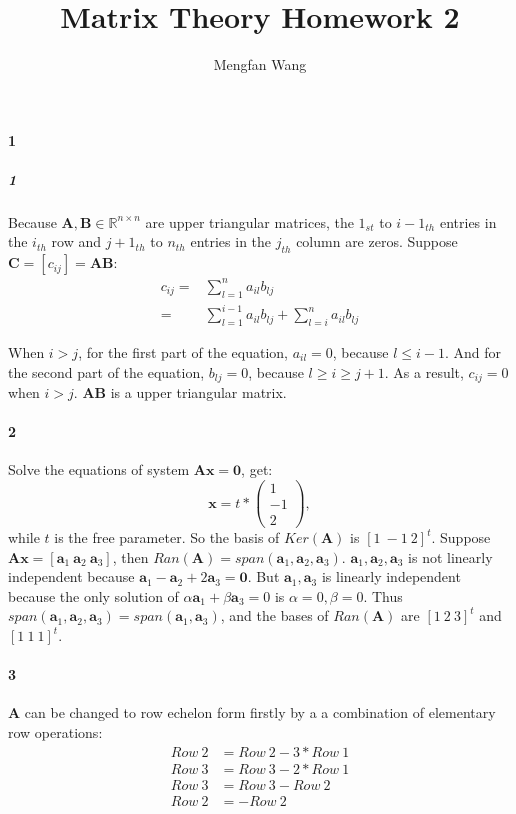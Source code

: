 \documentclass[22pt]{article}
\author{Mengfan Wang}
\title{Matrix Theory Homework 2}
\begin{document}
	\maketitle 
	\paragraph{1}
		\subparagraph{1} Because $\mathbf{A},\mathbf{B} \in \mathbb{R}^{n\times n}$ are upper triangular matrices, the $1_{st}$ to $i-1_{th}$ entries in the $i_{th}$ row and $j+1_{th}$ to $n_{th}$ entries in the $j_{th}$ column are zeros. Suppose $\mathbf{C} =[c_{ij}]= \mathbf{AB}$:
		\begin{align}
			c_{ij} =& \sum\limits_{l=1}^{n}a_{il}b_{lj}\\ =& \sum\limits_{l=1}^{i-1}a_{il}b_{lj} + \sum\limits_{l=i}^{n}a_{il}b_{lj}
		\end{align}

		When $i>j$, for the first part of the equation, $a_{il} = 0$, because $l \leq i-1$. And for the second part of the equation, $b_{lj}=0$, because $l \geq i \geq j+1$. As a result, $c_{ij} =0$ when $i>j$. $\mathbf{AB}$ is a upper triangular matrix.

	\paragraph{2} Solve the equations of system $\mathbf{Ax} = \mathbf{0}$, get:
	\begin{equation}
		\mathbf{x} = t*\left( \begin{array}{c} 1 \\-1\\2
		\end{array}\right),
 	\end{equation}
 	while $t$ is the free parameter. So the basis of $Ker(\mathbf{A})$ is $[1\ -1\ 2]^t$.
 	Suppose $\mathbf{Ax} = [\mathbf{a}_1\ \mathbf{a}_2\ \mathbf{a}_3]$, then $Ran(\mathbf{A}) = span(\mathbf{a}_1,\mathbf{a}_2,\mathbf{a}_3)$. $\mathbf{a}_1,\mathbf{a}_2,\mathbf{a}_3$ is not linearly independent because $\mathbf{a}_1-\mathbf{a}_2+2\mathbf{a}_3 = \mathbf{0}$. But $\mathbf{a}_1,\mathbf{a}_3$ is linearly independent because the only solution of $\alpha\mathbf{a}_1+\beta\mathbf{a}_3=0$ is $\alpha = 0, \beta = 0$. Thus $span(\mathbf{a}_1,\mathbf{a}_2,\mathbf{a}_3)=  span(\mathbf{a}_1,\mathbf{a}_3)$, and the bases of $Ran(\mathbf{A})$ are $[1\ 2\ 3]^t$ and $[1\ 1\ 1]^t$.

 	\paragraph{3} $\mathbf{A}$ can be changed to row echelon form firstly by a a combination of elementary row operations:
 	\begin{align}
 		Row\ 2 &=  Row\ 2 - 3*Row\ 1\\
 		Row\ 3 &= Row\ 3 - 2*Row\ 1\\
 		Row\ 3 &= Row\ 3 - Row\ 2\\
 		Row\ 2 &= - Row\ 2
 	\end{align}
\end{document}
